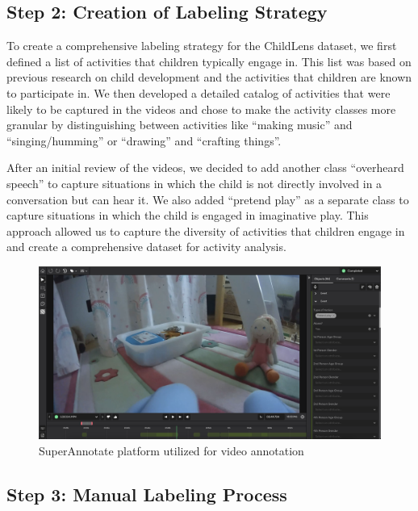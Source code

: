 \documentclass[
  man,floatsintext]{apa6}
\begin{document}
\subsection{Step 2: Creation of Labeling Strategy}\label{step-2-creation-of-labeling-strategy}

To create a comprehensive labeling strategy for the ChildLens dataset, we first defined a list of activities that children typically engage in. This list was based on previous research on child development and the activities that children are known to participate in. We then developed a detailed catalog of activities that were likely to be captured in the videos and chose to make the activity classes more granular by distinguishing between activities like ``making music'' and ``singing/humming'' or ``drawing'' and ``crafting things''.

After an initial review of the videos, we decided to add another class ``overheard speech'' to capture situations in which the child is not directly involved in a conversation but can hear it. We also added ``pretend play'' as a separate class to capture situations in which the child is engaged in imaginative play. This approach allowed us to capture the diversity of activities that children engage in and create a comprehensive dataset for activity analysis.

\begin{figure}

{\centering \includegraphics[width=5.76in]{SuperAnnotate} 

}

\caption{SuperAnnotate platform utilized for video annotation}\label{fig:superannotate}
\end{figure}

\subsection{Step 3: Manual Labeling Process}\label{step-3-manual-labeling-process}
\end{document}
